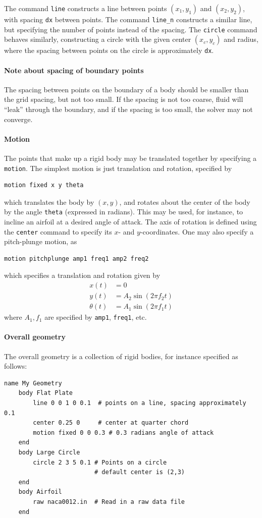 \documentclass[11pt]{article}
\begin{document}
The command {\tt line} constructs a line between points $(x_1,y_1)$ and $(x_2,y_2)$, with spacing {\tt dx} between points.  The command {\tt line\_n} constructs a similar line, but specifying the number of points instead of the spacing.  The {\tt circle} command behaves similarly, constructing a circle with the given center $(x_c,y_c)$ and radius, where the spacing between points on the circle is approximately {\tt dx}.

\paragraph{Note about spacing of boundary points}
The spacing between points on the boundary of a body should be smaller than the grid spacing, but not too small.  If the spacing is not too coarse, fluid will ``leak'' through the boundary, and if the spacing is too small, the solver may not converge.

\paragraph{Motion}
The points that make up a rigid body may be translated together by specifying a {\tt motion}.  The simplest motion is just translation and rotation, specified by
\begin{Verbatim}
motion fixed x y theta
\end{Verbatim}
which translates the body by $(x,y)$, and rotates about the center of the body by the angle {\tt theta} (expressed in radians).  This may be used, for instance, to incline an airfoil at a desired angle of attack.  The axis of rotation is defined using the {\tt center} command to specify its $x$- and $y$-coordinates.  One may also specify a pitch-plunge motion, as
\begin{Verbatim}
motion pitchplunge amp1 freq1 amp2 freq2
\end{Verbatim}
which specifies a translation and rotation given by
\begin{align*}
x(t) &= 0\\
y(t) &= A_2 \sin(2\pi f_2 t)\\
\theta(t) &= A_1 \sin(2\pi f_1 t)
\end{align*}
where $A_1,f_1$ are specified by {\tt amp1}, {\tt freq1}, etc.

\paragraph{Overall geometry}
The overall geometry is a collection of rigid bodies, for instance specified as follows:
\begin{Verbatim}[gobble=4]
    name My Geometry
    body Flat Plate
        line 0 0 1 0 0.1  # points on a line, spacing approximately 0.1
        center 0.25 0     # center at quarter chord
        motion fixed 0 0 0.3 # 0.3 radians angle of attack
    end
    body Large Circle
        circle 2 3 5 0.1 # Points on a circle
                         # default center is (2,3)
    end
    body Airfoil
        raw naca0012.in  # Read in a raw data file
    end
\end{Verbatim}
\end{document}
